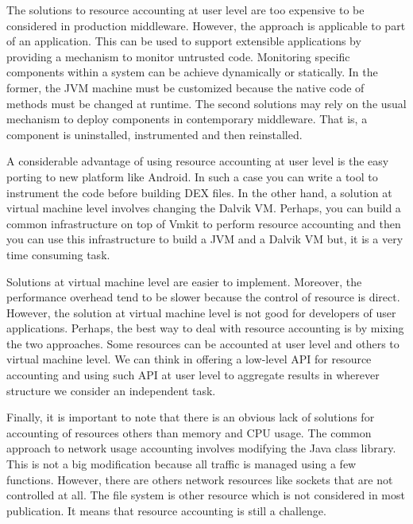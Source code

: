The solutions to resource accounting at user level are too expensive to be considered in production middleware. However, the approach is applicable to part of an application. This can be used to support extensible applications by providing a mechanism to monitor untrusted code. Monitoring specific components within a system can be achieve dynamically or statically. In the former, the JVM machine must be customized because the native code of methods must be changed at runtime. The second solutions may rely on the usual mechanism to deploy components in contemporary middleware. That is, a component is uninstalled, instrumented and then reinstalled.

A considerable advantage of using resource accounting at user level is the easy porting to new platform like Android. In such a case you can write a tool to instrument the code before building DEX files. In the other hand, a solution at virtual machine level involves changing the Dalvik VM. Perhaps, you can build a common infrastructure on top of Vmkit to perform resource accounting and then you can use this infrastructure to build a JVM and a Dalvik VM but, it is a very time consuming task.

Solutions at virtual machine level are easier to implement. Moreover, the performance overhead tend to be slower because the control of resource is direct. However, the solution at virtual machine level is not good for developers of user applications. Perhaps, the best way to deal with resource accounting is by mixing the two approaches. Some resources can be accounted at user level and others to virtual machine level. We can think in offering a low-level API for resource accounting and using such API at user level to aggregate results in wherever structure we consider an independent task.

Finally, it is important to note that there is an obvious lack of solutions for accounting of resources others than memory and CPU usage. The common approach to network usage accounting involves modifying the Java class library. This is not a big modification because all traffic is managed using a few functions. However, there are others network resources like sockets that are not controlled at all. The file system is other resource which is not considered in most publication. It means that resource accounting is still a challenge.


